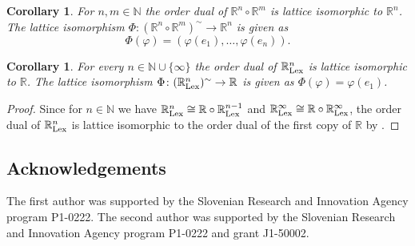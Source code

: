 \documentclass[12pt,reqno]{amsart}
\theoremstyle{plain}
\newtheorem{corollary}[theorem]{Corollary}
\theoremstyle{definition}
\begin{document}
\begin{corollary}
For $n,m\in \mathbb N$ the order dual of $\mathbb R^n\circ \mathbb R^m$ is lattice isomorphic to $\mathbb R^n$. The lattice isomorphism $\Phi\colon (\mathbb R^n\circ \mathbb R^m)^{\sim} \to \mathbb R^n$ is given as
$$\Phi(\varphi)=(\varphi(e_{1}),\ldots,\varphi(e_{n})).$$
\end{corollary}

\begin{corollary}
For every $n\in \mathbb N\cup \{\infty\}$ the order dual of $\mathbb R^n_{\rm{Lex}}$ is lattice isomorphic to $\mathbb R$.
The lattice isomorphism $\Phi\colon (\mathbb R^n_{\rm{Lex}})^{\sim} \to \mathbb R$ is given as
$\Phi(\varphi)=\varphi(e_1)$.
\end{corollary}


\begin{proof}
Since for $n\in \mathbb N$ we have $\mathbb R^n_{\rm{Lex}}\cong \mathbb R \circ \mathbb R^{n-1}_{\rm{Lex}}$ and $\mathbb R^\infty_{\rm{Lex}}\cong \mathbb R \circ \mathbb R^{\infty}_{\rm{Lex}}$, the order dual of $\mathbb R^n_{\rm{Lex}}$ is lattice isomorphic to the order dual of the first copy of $\mathbb R$ by .
\end{proof}


\subsection*{Acknowledgements}
The first author was supported by the Slovenian Research and Innovation Agency program P1-0222.
The second author was supported by the Slovenian Research and Innovation Agency program P1-0222 and grant J1-50002.
\end{document}
